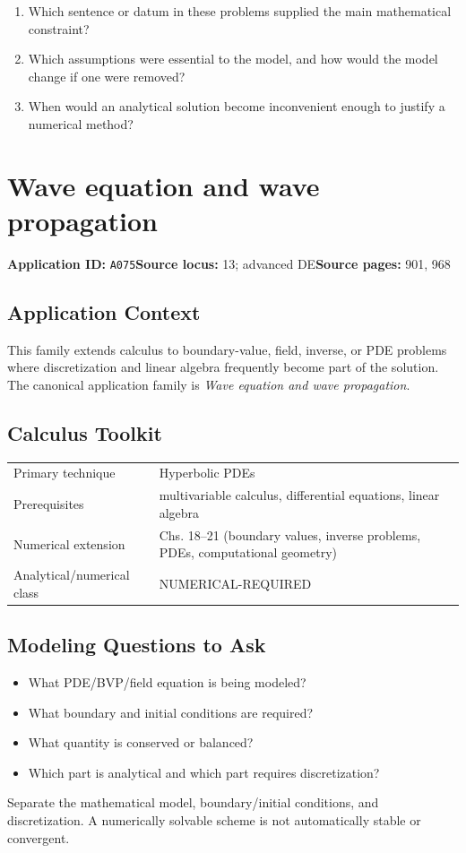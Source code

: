 \documentclass[11pt]{book}
\newcommand{\pid}[1]{\texttt{#1}}
\begin{document}
\begin{reflectionbox}\begin{enumerate}
\item Which sentence or datum in these problems supplied the main mathematical constraint?
\item Which assumptions were essential to the model, and how would the model change if one were removed?
\item When would an analytical solution become inconvenient enough to justify a numerical method?
\end{enumerate}\end{reflectionbox}
\chapter{Wave equation and wave propagation}\label{app:A075}
\textbf{Application ID:} \pid{A075}\quad \textbf{Source locus:} 13; advanced DE\quad \textbf{Source pages:} 901, 968
\section*{Application Context}
This family extends calculus to boundary-value, field, inverse, or PDE problems where discretization and linear algebra frequently become part of the solution. The canonical application family is \emph{Wave equation and wave propagation}.
\section*{Calculus Toolkit}
\begin{tabularx}{\textwidth}{@{}lX@{}}\toprule
Primary technique & Hyperbolic PDEs \\
Prerequisites & multivariable calculus, differential equations, linear algebra \\
Numerical extension & Chs. 18–21 (boundary values, inverse problems, PDEs, computational geometry) \\
Analytical/numerical class & NUMERICAL-REQUIRED \\
\bottomrule\end{tabularx}
\section*{Modeling Questions to Ask}\begin{itemize}
\item What PDE/BVP/field equation is being modeled?
\item What boundary and initial conditions are required?
\item What quantity is conserved or balanced?
\item Which part is analytical and which part requires discretization?
\end{itemize}
\begin{errorbox}Separate the mathematical model, boundary/initial conditions, and discretization. A numerically solvable scheme is not automatically stable or convergent.\end{errorbox}
\end{document}
